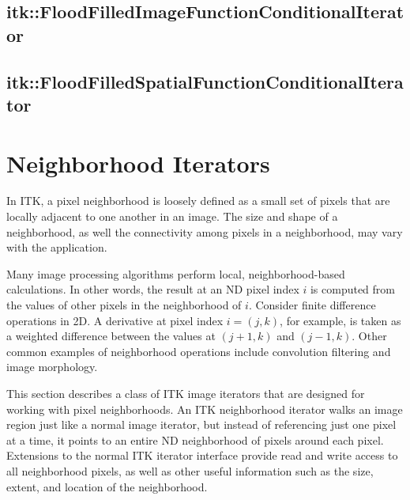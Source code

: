 \subsection{itk::FloodFilledImageFunctionConditionalIterator}
\label{itk::FloodFilledImageFunctionConditionalIterator}

\subsection{itk::FloodFilledSpatialFunctionConditionalIterator}
\label{itk::FloodFilledSpatialFunctionConditionalIterator}

\section{Neighborhood Iterators}
\label{sec:NeighborhoodIterators}
In ITK, a pixel neighborhood is loosely defined as a small set of pixels that
are locally adjacent to one another in an image.  The size and shape
of a neighborhood, as well the connectivity among pixels in a neighborhood,
may vary with the application.

Many image processing algorithms perform local, neighborhood-based
calculations.  In other words, the result at an ND pixel index $i$ is computed
from the values of other pixels in the neighborhood of $i$. Consider finite
difference operations in 2D.  A derivative at pixel index $i = (j, k)$, for
example, is taken as a weighted difference between the values at $(j+1, k)$
and $(j-1, k)$. Other common examples of neighborhood operations include
convolution filtering and image morphology.

This section describes a class of ITK image iterators that are designed for
working with pixel neighborhoods. An ITK neighborhood iterator walks an image
region just like a normal image iterator, but instead of referencing just one
pixel at a time, it points to an entire ND neighborhood of pixels around each
pixel. Extensions to the normal ITK iterator interface provide read and write
access to all neighborhood pixels, as well as other useful information
such as the size, extent, and location of the neighborhood.

